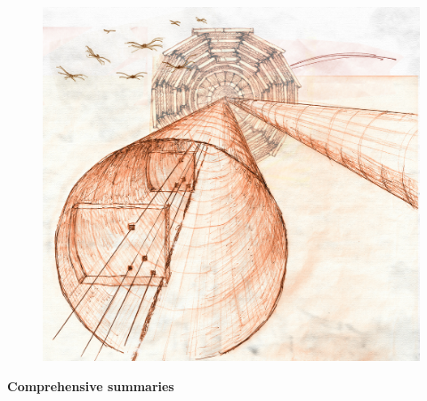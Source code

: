 \cleardoublepage\thispagestyle{empty}

\begin{center}
	
	\vspace*{10mm}
     


	
\begin{figure}[th]
	\centering
	\includegraphics[width=1.\linewidth]{./cover/CMSupgradeTOTEM1}
\end{figure}
\vspace{10mm}
	\huge \textbf{Comprehensive summaries}

	\vspace{10mm}



\end{center}

\cleardoublepage
\setlength{\topmargin}{0mm}
\normalsize%